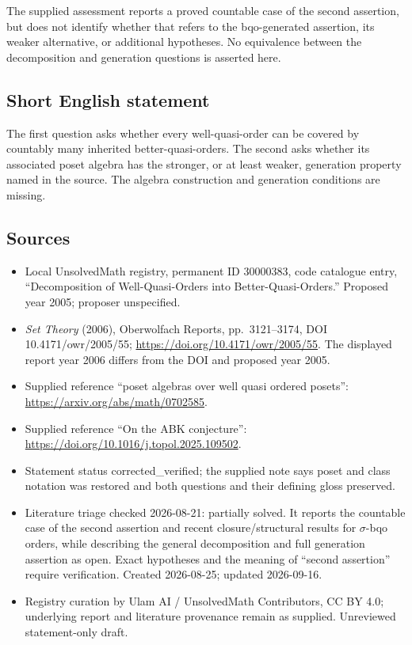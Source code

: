 \documentclass[11pt]{article}
\begin{document}
The supplied assessment reports a proved countable case of the second assertion, but does not identify whether that refers to the bqo-generated assertion, its weaker alternative, or additional hypotheses. No equivalence between the decomposition and generation questions is asserted here.
\subsection{Short English statement}
The first question asks whether every well-quasi-order can be covered by countably many inherited better-quasi-orders. The second asks whether its associated poset algebra has the stronger, or at least weaker, generation property named in the source. The algebra construction and generation conditions are missing.
\subsection{Sources}
\begin{itemize}
\item Local UnsolvedMath registry, permanent ID 30000383, code catalogue entry, ``Decomposition of Well-Quasi-Orders into Better-Quasi-Orders.'' Proposed year 2005; proposer unspecified.
\item \emph{Set Theory} (2006), Oberwolfach Reports, pp.\ 3121--3174, DOI 10.4171/owr/2005/55; \url{https://doi.org/10.4171/owr/2005/55}. The displayed report year 2006 differs from the DOI and proposed year 2005.
\item Supplied reference ``poset algebras over well quasi ordered posets'': \url{https://arxiv.org/abs/math/0702585}.
\item Supplied reference ``On the ABK conjecture'': \url{https://doi.org/10.1016/j.topol.2025.109502}.
\item Statement status corrected\_verified; the supplied note says poset and class notation was restored and both questions and their defining gloss preserved.
\item Literature triage checked 2026-08-21: partially solved. It reports the countable case of the second assertion and recent closure/structural results for $\sigma$-bqo orders, while describing the general decomposition and full generation assertion as open. Exact hypotheses and the meaning of ``second assertion'' require verification. Created 2026-08-25; updated 2026-09-16.
\item Registry curation by Ulam AI / UnsolvedMath Contributors, CC BY 4.0; underlying report and literature provenance remain as supplied. Unreviewed statement-only draft.
\end{itemize}
\end{document}
